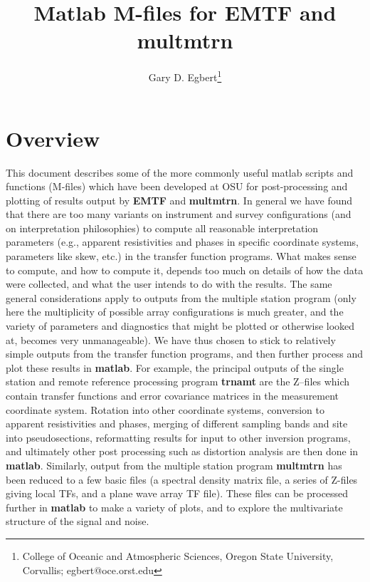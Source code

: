\setlength{\textheight}{23cm}
\setlength{\textwidth}{16cm}
\setlength{\oddsidemargin}{0.25in}
\setlength{\topmargin}{-0.5in}
\setlength{\parindent}{0em}
\title{Matlab M-files for EMTF and multmtrn}
\author{Gary D. Egbert\thanks{College of Oceanic and Atmospheric Sciences, Oregon State University, Corvallis; egbert@oce.orst.edu}}



\maketitle

\section{Overview}

This document describes some of the more commonly useful
matlab scripts and functions (M-files) which have been developed at OSU
for post-processing and plotting of results output by {\bf EMTF}
and {\bf multmtrn}.  In general we have found that there are 
too many variants on instrument and survey configurations (and
on interpretation philosophies) to compute all reasonable interpretation
parameters (e.g., apparent resistivities and phases in specific coordinate
systems, parameters like skew, etc.) in the transfer function programs.
What makes sense to compute, and how to compute it, depends too much
on details of how the data were collected, and what the user intends
to do with the results.  The same general considerations apply
to outputs from the multiple station program (only here the
multiplicity of possible array configurations is much greater,
and the variety of parameters and diagnostics that might be plotted
or otherwise looked at, becomes very unmanageable).
We have thus chosen to stick to relatively simple outputs
from the transfer function programs, and then further
process and plot these results in {\bf matlab}.  
For example, the principal outputs of the single station
and remote reference processing program {\bf trnamt}
are the Z--files which contain transfer functions and error
covariance matrices in the measurement coordinate system.
Rotation into other coordinate systems, conversion to apparent
resistivities and phases, merging of different sampling bands
and site into pseudosections, reformatting results for
input to other inversion programs, and ultimately
other post processing such as distortion analysis are then done
in {\bf matlab}.  Similarly, output from the multiple station program
{\bf multmtrn} has been reduced to a few basic files (a spectral density
matrix file, a series of Z-files giving local TFs, and a plane
wave array TF file).  These files can be processed further in
{\bf matlab} to make a variety of plots, and 
to explore the multivariate structure of the signal and noise.

